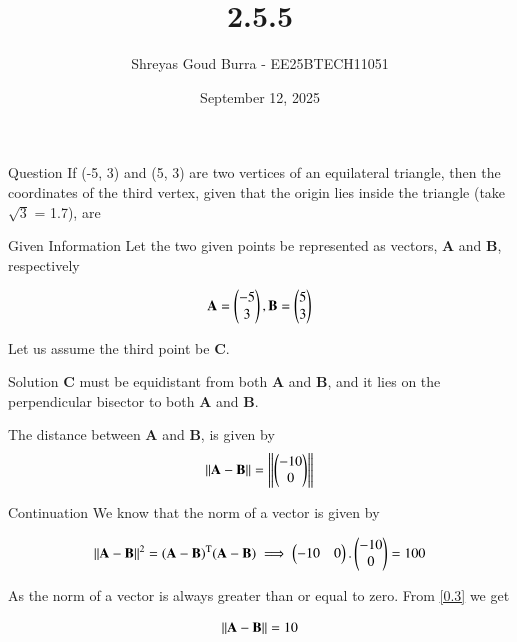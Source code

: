\documentclass{beamer}
\title %
{2.5.5}
\date{September 12, 2025}
\author 
{Shreyas Goud Burra - EE25BTECH11051}
\begin{document}
\frame{\titlepage}

\begin{frame}{Question}
    If (-5, 3) and (5, 3) are two vertices of an equilateral triangle, then the
coordinates of the third vertex, given that the origin lies inside the triangle (take $\sqrt{3}$ = 1.7), are
\end{frame}

\begin{frame}{Given Information}
    Let the two given points be represented as vectors, \textbf{A} and \textbf{B}, respectively

\begin{align}
    \textbf{A} = \begin{pmatrix}-5\\3\end{pmatrix}, \textbf{B} = \begin{pmatrix}5\\3\end{pmatrix}
    \label{0.1}
\end{align}

Let us assume the third point be \textbf{C}.\\
\end{frame}

\begin{frame}{Solution}
    \textbf{C} must be equidistant from both \textbf{A} and \textbf{B}, and it lies on the perpendicular bisector to both \textbf{A} and \textbf{B}.

The distance between \textbf{A} and \textbf{B}, is given by
\begin{align}
    \left\lVert\textbf{A}-\textbf{B}\right\rVert=\left\lVert\begin{pmatrix}-10\\0\end{pmatrix}\right\rVert
    \label{0.2}
\end{align}
\end{frame}

\begin{frame}{Continuation}
    We know that the norm of a vector is given by

\begin{align}
    \left\lVert\textbf{A}-\textbf{B}\right\rVert^2 = (\textbf{A}-\textbf{B})^\text{T}(\textbf{A}-\textbf{B}) \implies \begin{pmatrix}-10&0\end{pmatrix}.\begin{pmatrix}-10\\0\end{pmatrix}= 100
    \label{0.3}
\end{align}

As the norm of a vector is always greater than or equal to zero. From \ref{0.3} we get

\begin{align}
    \left\lVert\textbf{A}-\textbf{B}\right\rVert = 10
    \label{0.4}
\end{align}
\end{frame}
\end{document}
